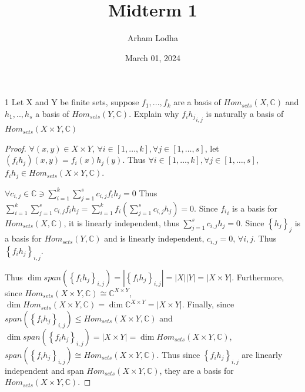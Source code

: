 \documentclass{article}
\newcommand{\C}{\mathbb{C}}
\begin{document}
\title{Midterm 1}
\author{Arham Lodha}%
\date{March 01, 2024}%
\maketitle

\begin{PROB}{1}\label{Problem 1.}
    Let X and Y be finite sets, suppose $f_1,...,f_k$ are a basis of $Hom_{sets}(X,\C)$ and $h_1,..,h_s$ a basis of $Hom_{sets}(Y,\C)$.  Explain why ${f_i h_j}_{i,j}$ is naturally a basis of $Hom_{sets}(X \times Y, \C)$
\end{PROB}
\begin{proof}
    $\forall (x, y) \in X \times Y$, $\forall i \in [1, \dots, k], \forall j \in [1, \dots, s]$, let $(f_i h_j)(x, y) = f_i(x)h_j(y)$. Thus $\forall i \in [1, \dots, k], \forall j \in [1, \dots, s]$, $f_i h_j \in Hom_{sets}(X \times Y, \C)$. 
    
    $\forall c_{i, j} \in \C \ni \sum_{i = 1}^{k} \sum_{j = 1}^{s} c_{i, j}f_i h_j = 0$ Thus
    $\sum_{i = 1}^{k} \sum_{j = 1}^{s} c_{i, j}f_i h_j = \sum_{i = 1}^{k} f_i \left(\sum_{j = 1}^{s} c_{i, j}h_j\right) = 0$. Since ${f_i}_i$ is a basis for $Hom_{sets}(X, \C)$, it is linearly independent, thus $\sum_{j = 1}^{s} c_{i, j}h_j = 0$. Since $\left\{ h_j \right\}_j$ is a basis for $Hom_{sets}(Y, \C)$ and is linearly independent, $c_{i, j} = 0$, $\forall i, j$. Thus $\left\{ f_i h_j \right\}_{i,j}$. 
    
    Thus $\dim span(\left\{ f_i h_j \right\}_{i,j}) = |\left\{ f_i h_j \right\}_{i, j}| = |X||Y| = |X \times Y|$. Furthermore, since $Hom_{sets}(X \times Y, \C) \cong \C^{X \times Y}$, $\dim Hom_{sets}(X \times Y, \C) = \dim \C^{X \times Y} = |X \times Y|$. Finally, since $span(\left\{ f_i h_j \right\}_{i,j}) \leq Hom_{sets}(X \times Y, \C)$ and $\dim span(\left\{ f_i h_j \right\}_{i,j}) = |X \times Y| = \dim Hom_{sets}(X \times Y, \C)$, $span(\left\{ f_i h_j \right\}_{i,j}) \cong Hom_{sets}(X \times Y, \C)$. Thus since $\left\{ f_i h_j \right\}_{i,j}$ are linearly independent and span $Hom_{sets}(X \times Y, \C)$, they are a basis for $Hom_{sets}(X \times Y, \C)$.
\end{proof}

\bigskip
\end{document}
